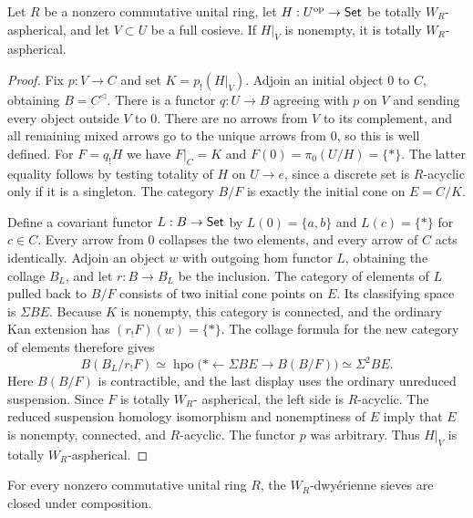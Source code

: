 \begin{lemma}
\label{F:cosieve-homology}
Let $R$ be a nonzero commutative unital ring, let
$H:U^{\mathrm{op}}\to\mathsf{Set}$ be totally $W_R$-aspherical,
and let $V\subset U$ be a full cosieve. If
$H|_V$ is nonempty, it is totally $W_R$-aspherical.
\end{lemma}

\begin{proof}
Fix $p:V\to C$ and set $K=p_!(H|_V)$.
Adjoin an initial object $0$ to $C$, obtaining
$B=C^{\triangleleft}$. There is a functor
$q:U\to B$ agreeing with $p$ on $V$ and
sending every object outside $V$ to $0$.
There are no arrows from $V$ to its complement,
and all remaining mixed arrows go to the unique
arrows from $0$, so this is well defined.
For $F=q_!H$ we have $F|_C=K$ and
$F(0)=\pi_0(U/H)=\{*\}$. The latter equality
follows by testing totality of $H$ on $U\to e$,
since a discrete set is $R$-acyclic only if it
is a singleton. The category $B/F$ is exactly
the initial cone on $E=C/K$.

Define a covariant functor $L:B\to\mathsf{Set}$ by
$L(0)=\{a,b\}$ and $L(c)=\{*\}$ for
$c\in C$. Every arrow from $0$ collapses
the two elements, and every arrow of $C$
acts identically. Adjoin an object $w$ with
outgoing hom functor $L$, obtaining the
collage $B_L$, and let $r:B\to B_L$ be
the inclusion. The category of elements of
$L$ pulled back to $B/F$ consists of two
initial cone points on $E$. Its classifying
space is $\Sigma BE$. Because $K$ is nonempty,
this category is connected, and the ordinary
Kan extension has $(r_!F)(w)=\{*\}$.
The collage formula for the new category of
elements therefore gives
\[
 B(B_L/r_!F)\simeq
 \operatorname{hpo}\bigl(*\leftarrow
     \Sigma BE\to B(B/F)\bigr)
 \simeq\Sigma^2 BE.
\]
Here $B(B/F)$ is contractible, and the last
display uses the ordinary unreduced
suspension. Since $F$ is totally $W_R$-
aspherical, the left side is $R$-acyclic.
The reduced suspension homology isomorphism
and nonemptiness of $E$ imply that $E$ is
nonempty, connected, and $R$-acyclic. The
functor $p$ was arbitrary. Thus $H|_V$
is totally $W_R$-aspherical.
\end{proof}

\begin{theorem}\label{F:strict-sieve-homology}
For every nonzero commutative unital ring $R$, the
$W_R$-dwy\'erienne sieves are closed under composition.
\end{theorem}


